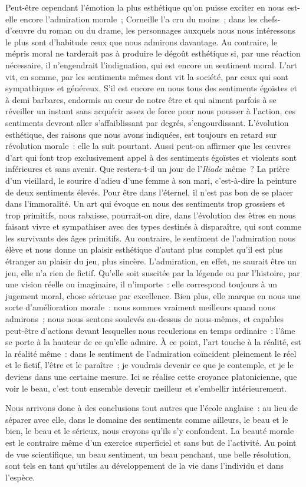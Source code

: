 \documentclass[french,twoside]{book} %
\begin{document}
Peut-être cependant l’émotion la plus esthétique qu’on puisse exciter en nous est-elle encore l’admiration morale ; Corneille l’a cru du moins ; dans les chefs-d’œuvre du roman ou du drame, les personnages auxquels nous nous intéressons le plus sont d’habitude ceux que nous admirons davantage. Au contraire, le mépris moral ne tarderait pas à produire le dégoût esthétique si, par une réaction nécessaire, il n’engendrait l’indignation, qui est encore un sentiment moral. L’art vit, en somme, par les sentiments mêmes dont vit la société, par ceux qui sont sympathiques et généreux. S’il est encore en nous tous des sentiments égoïstes et à demi barbares, endormis au cœur de notre être et qui aiment parfois à se réveiller un instant sans acquérir assez de force pour nous pousser à l’action, ces sentiments devront aller s’affaiblissant par degrés, s’engourdissant. L’évolution esthétique,  des raisons que nous avons indiquées, est toujours en retard sur révolution morale : elle la suit pourtant. Aussi peut-on affirmer que les œuvres d’art qui font trop exclusivement appel à des sentiments égoïstes et violents sont inférieures et sans avenir. Que restera-t-il un jour de l’\emph{Iliade} même ? La prière d’un vieillard, le sourire d’adieu d’une femme à son mari, c’est-à-dire la peinture de deux sentiments élevés. Pour être dans l’éternel, il n’est pas bon de se placer dans l’immoralité. Un art qui évoque en nous des sentiments trop grossiers et trop primitifs, nous rabaisse, pourrait-on dire, dans l’évolution des êtres en nous faisant vivre et sympathiser avec des types destinés à disparaître, qui sont comme les survivants des âges primitifs. Au contraire, le sentiment de l’admiration nous élève et nous donne un plaisir esthétique d’autant plus complet qu’il est plus étranger au plaisir du jeu, plus sincère. L’admiration, en effet, ne saurait être un jeu, elle n’a rien de fictif. Qu’elle soit suscitée par la légende ou par l’histoire, par une vision réelle ou imaginaire, il n’importe : elle correspond toujours à un jugement moral, chose sérieuse par excellence. Bien plus, elle marque en nous une sorte d’amélioration morale : nous sommes vraiment meilleurs quand nous admirons ; nous nous sentons soulevés au-dessus de nous-mêmes, et capables peut-être d’actions devant lesquelles nous reculerions en temps ordinaire : l’âme se porte à la hauteur de ce qu’elle admire. À ce point, l’art touche à la réalité, est la réalité même : dans le sentiment de l’admiration coïncident pleinement le réel et le fictif, l’être et le paraître ; je voudrais devenir ce que je contemple, et je le  deviens dans une certaine mesure. Ici se réalise cette croyance platonicienne, que voir le beau, c’est tout ensemble devenir meilleur et s’embellir intérieurement.\par
Nous arrivons donc à des conclusions tout autres que l’école anglaise : au lieu de séparer avec elle, dans le domaine des sentiments comme ailleurs, le beau et le bien, le beau et le sérieux, nous croyons qu’ils s’y confondent. La beauté morale est le contraire même d’un exercice superficiel et sans but de l’activité. Au point de vue scientifique, un beau sentiment, un beau penchant, une belle résolution, sont tels en tant qu’utiles au développement de la vie dans l’individu et dans l’espèce.
\end{document}
